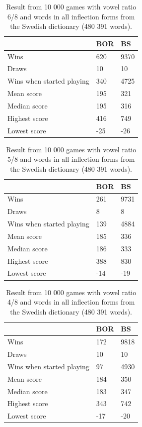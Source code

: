 \documentclass[a4paper, 12pt]{report}
\begin{document}
\begin{table}[h]
\centering
    \begin{tabular}{ l | l | l }
   	& BOR & BS \\
   	\hline
   	Wins & 620 & 9370\\
	Draws & 10 & 10 \\
	Wins when started playing & 340 & 4725 \\   	
	Mean score & 195 & 321 \\
	Median score & 195 & 316 \\	 	 
	Highest score & 416 & 749 \\
	Lowest score & -25 & -26 \\		
    \end{tabular}
\caption{Result from 10 000 games with vowel ratio 6/8 and words in all inflection forms from the Swedish dictionary (480 391 words).}
\label{tab:borbsstats6}
\end{table}

\begin{table}[h]
\centering
    \begin{tabular}{ l | l | l }
   	& BOR & BS \\
   	\hline
   	Wins & 261 & 9731\\
	Draws & 8 & 8 \\
	Wins when started playing & 139 & 4884 \\   	
	Mean score & 185 & 336 \\
	Median score & 186 & 333 \\	 	 
	Highest score & 388 & 830 \\
	Lowest score & -14 & -19 \\		
    \end{tabular}
\caption{Result from 10 000 games with vowel ratio 5/8 and words in all inflection forms from the Swedish dictionary (480 391 words).}
\label{tab:borbsstats5}
\end{table}

\begin{table}[h]
\centering
    \begin{tabular}{ l | l | l }
   	& BOR & BS \\
   	\hline
   	Wins & 172 & 9818 \\
	Draws & 10 & 10 \\
	Wins when started playing & 97 & 4930 \\   	
	Mean score & 184 & 350 \\
	Median score & 183 & 347 \\	 	 
	Highest score & 343 & 742 \\
	Lowest score & -17 & -20 \\		
    \end{tabular}
\caption{Result from 10 000 games with vowel ratio 4/8 and words in all inflection forms from the Swedish dictionary (480 391 words).}
\label{tab:borbsstats4}
\end{table}
\end{document}
